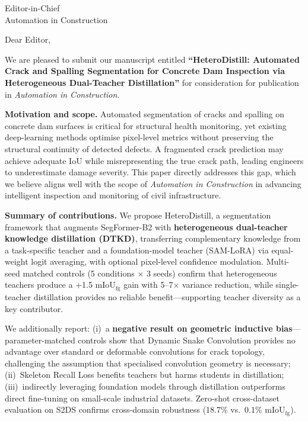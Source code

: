 \documentclass[11pt]{letter}
\begin{document}
\begin{letter}{Editor-in-Chief \\ Automation in Construction}

\opening{Dear Editor,}

We are pleased to submit our manuscript entitled \textbf{``HeteroDistill: Automated Crack and Spalling Segmentation for Concrete Dam Inspection via Heterogeneous Dual-Teacher Distillation''} for consideration for publication in \textit{Automation in Construction}.

\medskip
\textbf{Motivation and scope.}
Automated segmentation of cracks and spalling on concrete dam surfaces is critical for structural health monitoring, yet existing deep-learning methods optimise pixel-level metrics without preserving the structural continuity of detected defects. A fragmented crack prediction may achieve adequate IoU while misrepresenting the true crack path, leading engineers to underestimate damage severity. This paper directly addresses this gap, which we believe aligns well with the scope of \textit{Automation in Construction} in advancing intelligent inspection and monitoring of civil infrastructure.

\medskip
\textbf{Summary of contributions.}
We propose HeteroDistill, a segmentation framework that augments SegFormer-B2 with \textbf{heterogeneous dual-teacher knowledge distillation (DTKD)}, transferring complementary knowledge from a task-specific teacher and a foundation-model teacher (SAM-LoRA) via equal-weight logit averaging, with optional pixel-level confidence modulation. Multi-seed matched controls (5 conditions $\times$ 3 seeds) confirm that heterogeneous teachers produce a +1.5 mIoU$_{\text{fg}}$ gain with 5--7$\times$ variance reduction, while single-teacher distillation provides no reliable benefit---supporting teacher diversity as a key contributor.

We additionally report: (i)~a \textbf{negative result on geometric inductive bias}---parameter-matched controls show that Dynamic Snake Convolution provides no advantage over standard or deformable convolutions for crack topology, challenging the assumption that specialised convolution geometry is necessary; (ii)~Skeleton Recall Loss benefits teachers but harms students in distillation; (iii)~indirectly leveraging foundation models through distillation outperforms direct fine-tuning on small-scale industrial datasets. Zero-shot cross-dataset evaluation on S2DS confirms cross-domain robustness (18.7\% vs.\ 0.1\% mIoU$_{\text{fg}}$).


\end{letter}
\end{document}
